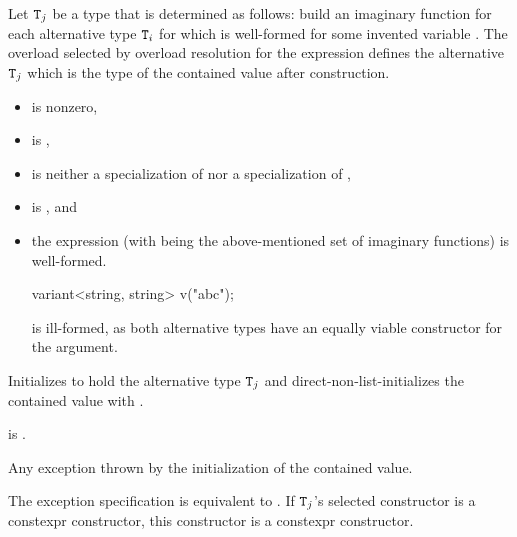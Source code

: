 \begin{itemdescr}
\pnum
Let $\tcode{T}_j$ be a type that is determined as follows:
build an imaginary function 
for each alternative type $\tcode{T}_i$
for which  
is well-formed for some invented variable .
The overload  selected by overload
resolution for the expression  defines
the alternative $\tcode{T}_j$ which is the type of the contained value after
construction.

\pnum
\constraints
\begin{itemize}
\item
{} is nonzero,

\item
{} is ,

\item
{} is neither
a specialization of  nor
a specialization of ,

\item
{} is , and

\item
the expression \brk{}
(with  being the above-mentioned set of
imaginary functions) is well-formed.
\begin{note}
\begin{codeblock}
variant<string, string> v("abc");
\end{codeblock}
is ill-formed, as both alternative types have an equally viable constructor
for the argument.
\end{note}
\end{itemize}

\pnum
\effects
Initializes  to hold the alternative type $\tcode{T}_j$ and
direct-non-list-initializes the contained value with .

\pnum
\ensures
{} is .

\pnum
\throws
Any exception thrown by
the initialization of the contained value.

\pnum
\remarks
The exception specification is equivalent to
.
If $\tcode{T}_j$'s selected constructor is a constexpr constructor,
this constructor is a constexpr constructor.
\end{itemdescr}


